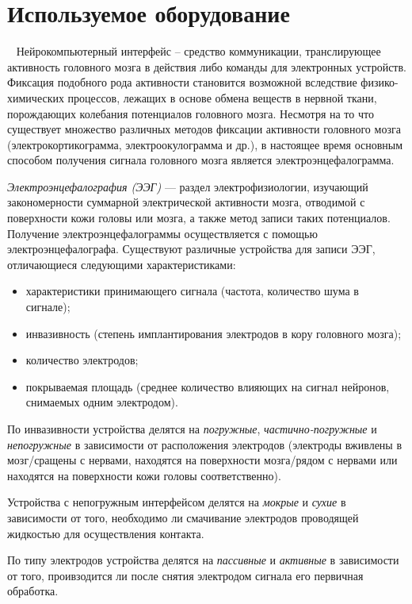 \documentclass[12pt,fleqn]{article}
\begin{document}
\section{Используемое оборудование}
	\quad\,\,\, Нейрокомпьютерный интерфейс -- средство коммуникации, транслирующее активность головного мозга в действия либо команды для электронных устройств. Фиксация подобного рода активности становится возможной вследствие физико-химических процессов, лежащих в основе обмена веществ в нервной ткани, порождающих колебания потенциалов головного мозга. Несмотря на то что существует множество различных методов фиксации активности головного мозга (электрокортикограмма, электроокулограмма и др.), в настоящее время основным способом получения сигнала головного мозга является электроэнцефалограмма. 
	\par {\it Электроэнцефалография (ЭЭГ)} — раздел электрофизиологии, изучающий закономерности суммарной электрической активности мозга, отводимой с поверхности кожи головы или мозга, а также метод записи таких потенциалов. Получение электроэнцефалограммы осуществляется с помощью электроэнцефалографа. Существуют различные устройства для записи ЭЭГ, отличающиеся следующими характеристиками: 
	\begin{itemize}\itemsep0pt
	\item
	характеристики принимающего сигнала (частота, количество шума в сигнале);
	\item
	инвазивность (степень имплантирования электродов в кору головного мозга);
	\item
	количество электродов;
	\item
	покрываемая площадь (среднее количество влияющих на сигнал нейронов, снимаемых одним электродом).
	\end{itemize}
	\par По инвазивности устройства делятся на {\it погружные}, {\it частично-погружные} и {\it непогружные} в зависимости от расположения электродов (электроды вживлены в мозг/сращены с нервами, находятся на поверхности мозга/рядом с нервами или находятся на поверхности кожи головы соответственно).

	\par Устройства с непогружным интерфейсом делятся на {\it мокрые} и {\it сухие} в зависимости от того, необходимо ли смачивание электродов проводящей жидкостью для осуществления контакта.
	\par По типу электродов устройства делятся на {\it пассивные} и {\it активные} в зависимости от того, проивзодится ли после снятия электродом сигнала его первичная обработка.
\end{document}

